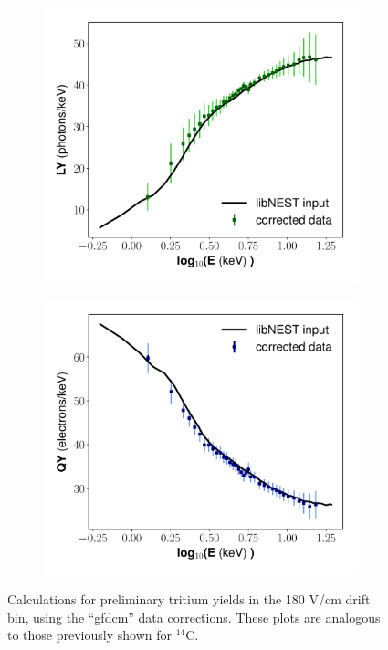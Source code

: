 \begin{figure}[h!]
\begin{subfigure}{0.45\textwidth}
  \caption{}
\end{subfigure}
\begin{subfigure}{0.45\textwidth}
  \centering
  \includegraphics[width=\textwidth]{Figures/yields_corrections/H3_LY_final_gfdcm_180Vcm_prelim.pdf}
  \caption{}
\end{subfigure}%
\begin{subfigure}{0.45\textwidth}
  \centering
  \includegraphics[width=\textwidth]{Figures/yields_corrections/H3_QY_final_gfdcm_180Vcm_prelim.pdf}
  \caption{}
\end{subfigure}
\caption{Calculations for preliminary tritium yields in the 180 V/cm drift bin, using the ``gfdcm'' data corrections. These plots are analogous to those previously shown for $^{14}$C.}
\label{fig:h3_180}
\end{figure}

